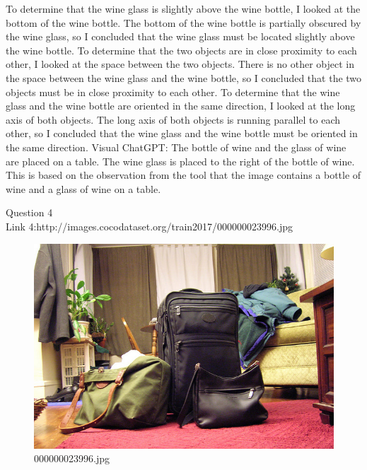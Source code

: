 \begin{enumerate}
{        To determine that the wine glass is slightly above the wine bottle, I looked at the bottom of the wine bottle. The bottom of the wine bottle is partially obscured by the wine glass, so I concluded that the wine glass must be located slightly above the wine bottle.
        To determine that the two objects are in close proximity to each other, I looked at the space between the two objects. There is no other object in the space between the wine glass and the wine bottle, so I concluded that the two objects must be in close proximity to each other.
        To determine that the wine glass and the wine bottle are oriented in the same direction, I looked at the long axis of both objects. The long axis of both objects is running parallel to each other, so I concluded that the wine glass and the wine bottle must be oriented in the same direction.}
        \subitem Visual ChatGPT: The bottle of wine and the glass of wine are placed on a table. The wine glass is placed to the right of the bottle of wine. This is based on the observation from the tool that the image contains a bottle of wine and a glass of wine on a table.
    \end{enumerate}
Question 4\\
Link 4:http://images.cocodataset.org/train2017/000000023996.jpg
    \begin{figure}[h]
        \centering
        \includegraphics[width=0.8\linewidth]{../image set/easy/000000023996.jpg}
        \caption{000000023996.jpg}
    \end{figure}
